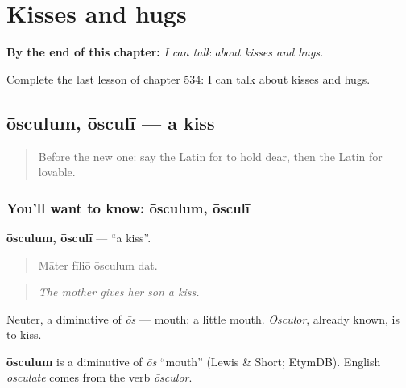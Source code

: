 
\chapter{Kisses and hugs}
\label{ch:la-kisses-and-hugs}

\begin{chapteropening}
\textbf{By the end of this chapter:} \emph{I can talk about kisses and hugs.}

Complete the last lesson of chapter 534: I can talk about kisses and hugs.
\end{chapteropening}

\section[ōsculum, ōsculī]{ōsculum, ōsculī — a kiss}

\label{lesson:LA-C534-osculum}



\begin{quote}
Before the new one: say the Latin for to hold dear, then the Latin for lovable.
\end{quote}

\subsection*{You'll want to know: ōsculum, ōsculī}
\textbf{ōsculum, ōsculī} — \textquotedblleft{}a kiss\textquotedblright{}.

\begin{quote}
Māter fīliō ōsculum dat.
\end{quote}

\begin{quote}
\emph{The mother gives her son a kiss.}
\end{quote}

Neuter, a diminutive of \emph{ōs} — mouth: a little mouth. \emph{Ōsculor}, already known, is to kiss.

\begin{cousinweb}
\textbf{ōsculum} is a diminutive of \emph{ōs} \textquotedblleft{}mouth\textquotedblright{} (Lewis \& Short; EtymDB). English \emph{osculate} comes from the verb \emph{ōsculor}.
\end{cousinweb}

